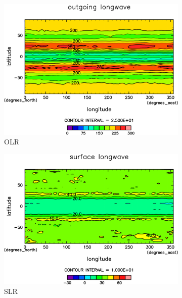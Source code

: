 \documentclass[body]{subfiles}
\begin{document}
\begin{figure}[t]
	\centering
	\begin{subfigure}{.4\textwidth}
		\centering
		\includegraphics[width=\textwidth]{S1500/OLR,time=3650:4015-crop-rotate.pdf}
		\caption{OLR \hmu*{[W/m^{-2}]}}\label{S1500OLR}
	\end{subfigure}
	\begin{subfigure}{.4\textwidth}
		\centering
		\includegraphics[width=\textwidth]{S1500/SLR,time=3650:4015-crop-rotate.pdf}
		\caption{SLR\hmu*{[W/m^{-2}]}}\label{S1500SLR}
	\end{subfigure}
	\begin{subfigure}{.4\textwidth}
		\centering

\end{subfigure}
\end{figure}
\end{document}
